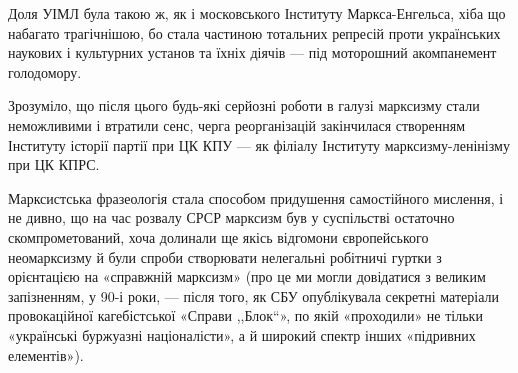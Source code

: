 Доля УІМЛ була такою ж, як і московського Інституту Маркса-Енгельса, 
хіба що набагато трагічнішою, бо стала частиною тотальних репресій 
проти українських наукових і культурних установ та їхніх діячів — під 
моторошний акомпанемент голодомору. 


Зрозуміло, що після цього будь-які серйозні роботи в галузі марксизму 
стали неможливими і втратили сенс, черга реорганізацій закінчилася 
створенням Інституту історії партії при ЦК КПУ — як філіалу Інституту 
марксизму-ленінізму при ЦК КПРС. 


Марксистська фразеологія стала способом придушення самостійного 
мислення, і не дивно, що на час розвалу СРСР марксизм був у суспільстві 
остаточно скомпрометований, хоча долинали ще якісь відгомони 
європейського неомарксизму й були спроби створювати нелегальні 
робітничі гуртки з орієнтацією на «справжній марксизм» (про це ми 
могли довідатися з великим запізненням, у 90-і роки, — після того, як СБУ 
опублікувала секретні матеріали провокаційної кагебістської «Справи 
,,Блок``», по якій «проходили» не тільки «українські буржуазні 
націоналісти», а й широкий спектр інших «підривних елементів»). 


